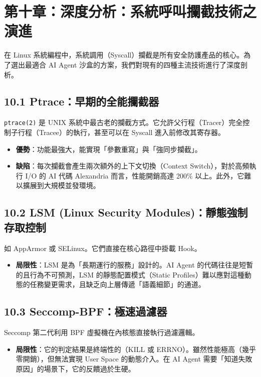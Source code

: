\documentclass[12pt, a4paper, twoside]{article}
\begin{document}
\newpage
\newpage
\section{第十章：深度分析：系統呼叫攔截技術之演進}

在 Linux 系統編程中，系統調用（Syscall）攔截是所有安全防護產品的核心。為了選出最適合 AI Agent 沙盒的方案，我們對現有的四種主流技術進行了深度剖析。

\subsection{10.1 Ptrace：早期的全能攔截器}
\texttt{ptrace(2)} 是 UNIX 系統中最古老的攔截方式。它允許父行程（Tracer）完全控制子行程（Tracee）的執行，甚至可以在 Syscall 進入前修改其寄存器。
\begin{itemize}
    \item \textbf{優勢}：功能最強大，能實現「參數重寫」與「強同步攔截」。
    \item \textbf{缺陷}：每次攔截會產生兩次額外的上下文切換（Context Switch），對於高頻執行 I/O 的 AI 代碼 Alexandria 而言，性能開銷高達 200\% 以上。此外，它難以擴展到大規模並發環境。
\end{itemize}

\subsection{10.2 LSM (Linux Security Modules)：靜態強制存取控制}
如 AppArmor 或 SELinux。它們直接在核心路徑中掛載 Hook。
\begin{itemize}
    \item \textbf{局限性}：LSM 是為「長期運行的服務」設計的。AI Agent 的代碼往往是短暫的且行為不可預測，LSM 的靜態配置模式（Static Profiles）難以應對這種動態的任務變更需求，且缺乏向上層傳遞「語義細節」的通道。
\end{itemize}

\subsection{10.3 Seccomp-BPF：極速過濾器}
Seccomp 第二代利用 BPF 虛擬機在內核態直接執行過濾邏輯。
\begin{itemize}
    \item \textbf{局限性}：它的判定結果是終端性的（KILL 或 ERRNO）。雖然性能極高（幾乎零開銷），但無法實現 User Space 的動態介入。在 AI Agent 需要「知道失敗原因」的場景下，它的反饋過於生硬。
\end{itemize}
\end{document}
